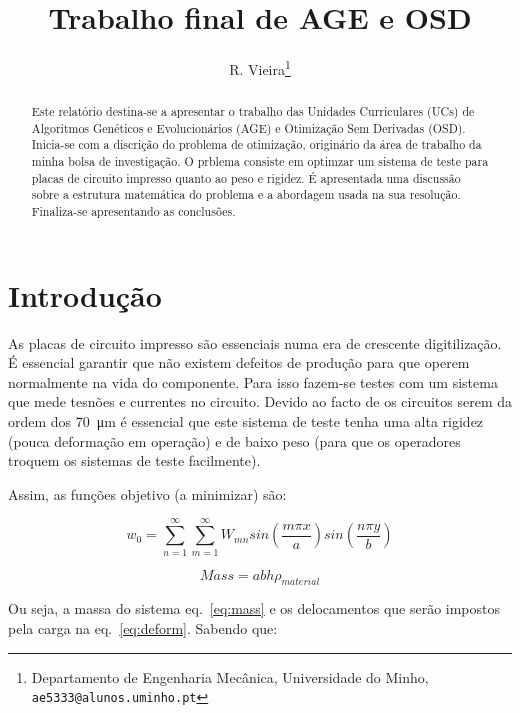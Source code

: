 \documentclass[a4paper,12pt]{article}
\begin{document}
%
\title{Trabalho final de AGE e OSD}


\author{R. Vieira\thanks{Departamento de Engenharia Mecânica, Universidade do Minho, {\tt ae5333@alunos.uminho.pt}}}

\maketitle              %

\begin{abstract}
Este relatório destina-se a apresentar o trabalho das Unidades Curriculares (UCs) de Algoritmos Genéticos e Evolucionários (AGE) e Otimização Sem Derivadas (OSD). Inicia-se com a discrição do problema de otimização, originário da área de trabalho da minha bolsa de investigação. O prblema consiste em optimzar um sistema de teste para placas de circuito impresso quanto ao peso e rigidez. É apresentada uma discussão sobre a estrutura matemática do problema e a abordagem usada na sua resolução. Finaliza-se apresentando as conclusões.
\end{abstract}

\section{Introdução}

As placas de circuito impresso são essenciais numa era de crescente digitilização. É essencial garantir que não existem defeitos de produção para que operem normalmente na vida do componente. Para isso fazem-se testes com um sistema que mede tesnões e currentes no circuito. Devido ao facto de os circuitos serem da ordem dos \SI{70}{\micro\metre} é essencial que este sistema de teste tenha uma alta rigidez (pouca deformação em operação) e de baixo peso (para que os operadores troquem os sistemas de teste facilmente). 

Assim, as funções objetivo (a minimizar) são:


\begin{equation}\label{eq:deform}
w_0= \sum_{n=1}^{\infty} \sum_{m=1}^{\infty} W_{mn} sin\left(\frac{m \pi x}{a}\right) sin\left(\frac{n \pi y}{b}\right)
\end{equation}

\begin{equation}\label{eq:mass}
Mass = a b h \rho_{material}
\end{equation}

Ou seja, a massa do sistema eq.~\ref{eq:mass} e os delocamentos que serão impostos pela carga na eq.~\ref{eq:deform}. Sabendo que:
\end{document}
